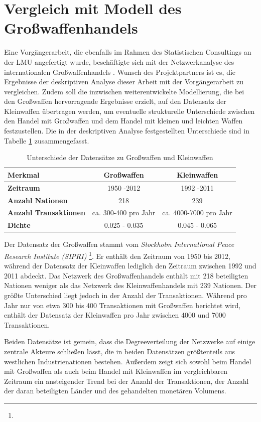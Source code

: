 \documentclass[a4paper,ngerman,oneside,titlepage,bibliography=totoc,11pt]{scrreprt}
\begin{document}
\section{Vergleich mit Modell des Großwaffenhandels}
Eine Vorgängerarbeit, die ebenfalls im Rahmen des Statistischen Consultings an der LMU angefertigt wurde, beschäftigte sich mit der Netzwerkanalyse des internationalen Großwaffenhandels \citep{js14}. Wunsch des Projektpartners ist es, die Ergebnisse der deskriptiven Analyse dieser Arbeit mit der Vorgängerarbeit zu vergleichen. Zudem soll die inzwischen weiterentwickelte Modellierung, die bei den Großwaffen hervorragende Ergebnisse erzielt, auf den Datensatz der Kleinwaffen übertragen werden, um eventuelle strukturelle Unterschiede zwischen den Handel mit Großwaffen und dem Handel mit kleinen und leichten Waffen  festzustellen. Die in der deskriptiven Analyse festgestellten Unterschiede sind in Tabelle \ref{tab:unterschiede} zusammengefasst.
\begin{table}[h]
		\centering
			\begin{tabular}{|l|c|c|}
				\hline
				Merkmal & Großwaffen & Kleinwaffen \\
				\hline
				\textbf{Zeitraum} & 1950 -2012 & 1992 -2011 \\
				\textbf{Anzahl Nationen} & 218 & 239 \\
				\textbf{Anzahl Transaktionen} &ca. 300-400 pro Jahr &ca. 4000-7000 pro Jahr\\
				\textbf{Dichte} & 0.025 - 0.035& 0.045 - 0.065\\
				\hline
			\end{tabular}
			\label{tab:unterschiede}
			\caption{Unterschiede der Datensätze zu Großwaffen und Kleinwaffen}
	\end{table}
Der Datensatz der Großwaffen stammt vom \emph{Stockholm International Peace Research Institute (SIPRI)} \footnote{}. Er enthält den Zeitraum von 1950 bis 2012, während der Datensatz der Kleinwaffen lediglich den Zeitraum zwischen 1992 und 2011 abdeckt. Das Netzwerk des Großwaffenhandels enthält mit 218 beteiligten Nationen weniger als das Netzwerk des Kleinwaffenhandels mit 239 Nationen. Der größte Unterschied liegt jedoch in der Anzahl der Transaktionen. Während pro Jahr nur von etwa 300 bis 400 Transaktionen mit Großwaffen berichtet wird, enthält der Datensatz der Kleinwaffen pro Jahr zwischen 4000 und 7000 Transaktionen.

Beiden Datensätze ist gemein, dass die Degreeverteilung der Netzwerke auf einige zentrale Akteure schließen lässt, die in beiden Datensätzen größtenteils aus westlichen Industrienationen bestehen. Außerdem zeigt sich sowohl beim Handel mit Großwaffen als auch beim Handel mit Kleinwaffen im vergleichbaren Zeitraum ein ansteigender Trend bei der Anzahl der Transaktionen, der Anzahl der daran beteiligten Länder und des gehandelten monetären Volumens.
\end{document}
